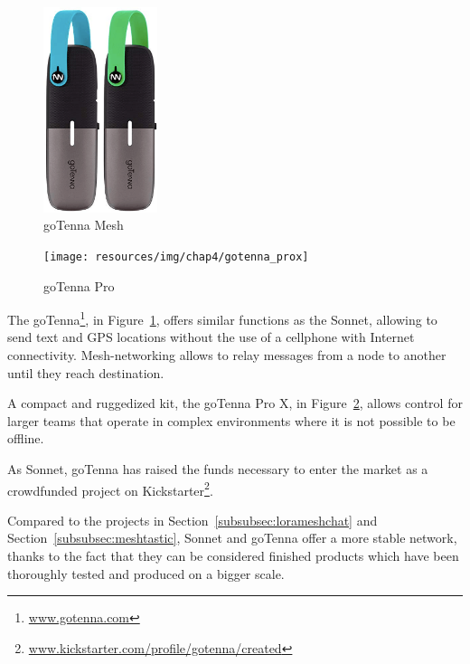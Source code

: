 				\begin{minipage}{0.5\textwidth}%
					\begin{figure}[H]
						\centering
						\includegraphics[height=6cm]{resources/img/chap4/gotenna}
						\caption{goTenna Mesh}
						\label{img:gotenna}
					\end{figure}
				\end{minipage}%
				\hfill%
				\begin{minipage}{0.5\textwidth}\raggedright
					\begin{figure}[H]
						\centering
						\texttt{[image: resources/img/chap4/gotenna\_prox]}
						\caption{goTenna Pro}
						\label{img:gotenna_pro}
					\end{figure}
				\end{minipage}%
				
				The goTenna\footnote{ \url{www.gotenna.com}}, in Figure~\ref{img:gotenna}, offers similar functions as the Sonnet, allowing to send text and GPS locations without the use of a cellphone with Internet connectivity.
				Mesh-networking allows to relay messages from a node to another until they reach destination.
				
				A compact and ruggedized kit, the goTenna Pro X, in Figure~\ref{img:gotenna_pro}, allows control for larger teams that operate in complex environments where it is not possible to be offline.
						
				As Sonnet, goTenna has raised the funds necessary to enter the market as a crowdfunded project on Kickstarter\footnote{ \url{www.kickstarter.com/profile/gotenna/created}}.
				
				Compared to the projects in Section~\ref{subsubsec:lorameshchat} and Section~\ref{subsubsec:meshtastic}, Sonnet and goTenna offer a more stable network, thanks to the fact that they can be considered finished products which have been thoroughly tested and produced on a bigger scale.
						
